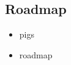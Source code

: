 \subsection{Roadmap}
\label{ssec:roadmap}

\begin{itemize}
	\item pigs
	\item roadmap
\end{itemize}
